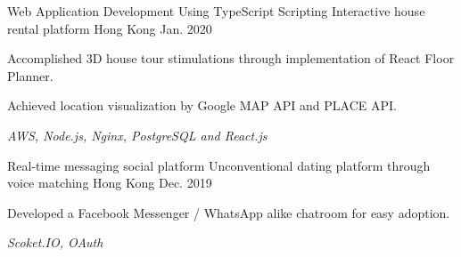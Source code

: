 

\begin{cventries}

  \cventry
    {Web Application Development Using TypeScript Scripting} %
    {Interactive house rental platform} %
    {Hong Kong} %
    {Jan. 2020} %
    {
      \begin{cvitems} %
        \item {Accomplished 3D house tour stimulations through implementation of React Floor Planner.}
        \item {Achieved location visualization by Google MAP API and PLACE API.}
        \item {\textit{AWS, Node.js, Nginx, PostgreSQL and React.js}}
      \end{cvitems}
    }

  \cventry
    {Real-time messaging social platform} %
    {Unconventional dating platform through voice matching} %
    {Hong Kong} %
    {Dec. 2019} %
    {
      \begin{cvitems} %
        \item {Developed a Facebook Messenger / WhatsApp alike chatroom for easy adoption.}
        \item {\textit{Scoket.IO, OAuth}}
      \end{cvitems}
    }
    
\end{cventries}
